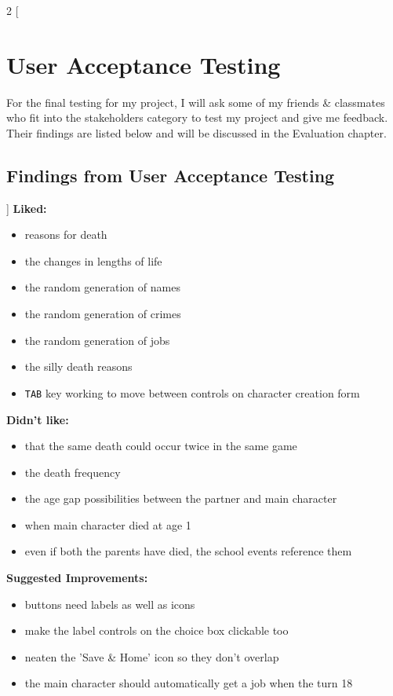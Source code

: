 \begin{multicols}{2}
[
\section{User Acceptance Testing}
For the final testing for my project, I will ask some of my friends \& classmates who fit into the stakeholders category to test my project and give me feedback. Their findings are listed below and will be discussed in the Evaluation chapter.
\subsection{Findings from User Acceptance Testing}
]
\textbf{Liked:}
\begin{itemize}
    \item reasons for death
    \item the changes in lengths of life
    \item the random generation of names
    \item the random generation of crimes
    \item the random generation of jobs
    \item the silly death reasons
    \item \verb|TAB| key working to move between controls on character creation form
\end{itemize}

\textbf{Didn't like:}
\begin{itemize}
    \item that the same death could occur twice in the same game
    \item the death frequency
    \item the age gap possibilities between the partner and main character
    \item when main character died at age 1
    \item even if both the parents have died, the school events reference them
\end{itemize}
\textbf{Suggested Improvements:}
\begin{itemize}
    \item buttons need labels as well as icons
    \item make the label controls on the choice box clickable too
    \item neaten the 'Save \& Home' icon so they don't overlap
    \item the main character should automatically get a job when the turn 18
\end{itemize}
\end{multicols}

